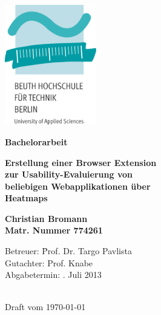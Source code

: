 %
%

\thispagestyle{empty}

\begin{center}

\vspace*{-1cm}

\includegraphics[width=0.3\textwidth]{./images/beuth_logo}

\vspace{2cm}

{\Large \textbf{Bachelorarbeit}}\\ 

\vspace{1cm}

{\Huge \textbf{Erstellung einer Browser Extension}}\\
\vspace*{3mm}
{\Huge \textbf{zur Usability-Evaluierung von}}\\
\vspace*{3mm}
{\Huge \textbf{beliebigen Webapplikationen über}}\\
\vspace*{3mm}
{\Huge \textbf{Heatmaps}}\\

\vspace{2cm}

{\Large \textbf{Christian Bromann}}\\ 
\textbf{Matr. Nummer 774261}

\vspace{2cm}

\parbox{1cm}{
\begin{large}
\begin{tabbing}
Betreuer: \hspace{1.5cm}\=Prof. Dr. Targo Pavlista\\[1mm]
Gutachter: \>Prof. Knabe\\[2mm]
Abgabetermin: . Juli 2013\\
\end{tabbing}
\end{large}}\\

Draft vom \today 			%

\end{center}

\newpage
